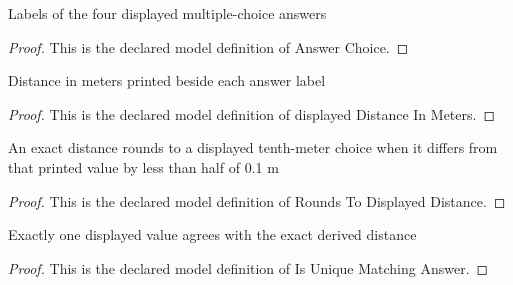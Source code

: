 \begin{definition}
  \label{def:physics:phyx-mini-0316:phyxminiproblems-problemphyxmini0316-answerchoice}
  Labels of the four displayed multiple-choice answers
\end{definition}
\begin{proof}
  This is the declared model definition of Answer Choice.
\end{proof}
\begin{definition}
  \label{def:physics:phyx-mini-0316:phyxminiproblems-problemphyxmini0316-displayeddistanceinmeters}
  Distance in meters printed beside each answer label
\end{definition}
\begin{proof}
  This is the declared model definition of displayed Distance In Meters.
\end{proof}
\begin{definition}
  \label{def:physics:phyx-mini-0316:phyxminiproblems-problemphyxmini0316-roundstodisplayeddistance}
  An exact distance rounds to a displayed tenth-meter choice when it differs from that printed value by less than half of 0.1 m
\end{definition}
\begin{proof}
  This is the declared model definition of Rounds To Displayed Distance.
\end{proof}
\begin{definition}
  \label{def:physics:phyx-mini-0316:phyxminiproblems-problemphyxmini0316-isuniquematchinganswer}
  Exactly one displayed value agrees with the exact derived distance
\end{definition}
\begin{proof}
  This is the declared model definition of Is Unique Matching Answer.
\end{proof}

